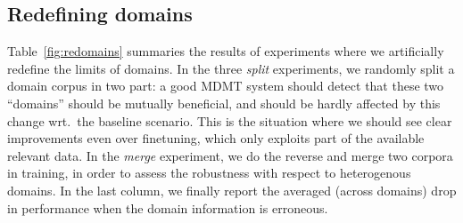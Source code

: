 \documentclass[11pt]{article}
\newcommand{\fyTodo}[1]{\Todo[FY:]{\textcolor{orange}{#1}}}
\begin{document}
\subsection{Redefining domains \label{ssec:redomains}}
Table~\ref{fig:redomains} summaries the results of \fyTodo{XX} experiments where we artificially redefine the limits of domains. In the three \textsl{split} experiments, we randomly split a domain corpus in two part: a good MDMT system should detect that these two ``domains'' should be mutually beneficial, and should be hardly affected by this change wrt.\ the baseline scenario. This is the situation where we should see clear improvements even over finetuning, which only exploits part of the available relevant data. In the \textsl{merge} experiment, we do the reverse and merge two corpora in training, in order to assess the robustness with respect to heterogenous domains. \fyTodo{Prepare table for the wrong domain analysis (see also last col. of the first table)}In the last column, we finally report the averaged (across domains) drop in performance when the domain information is erroneous.
\end{document}
